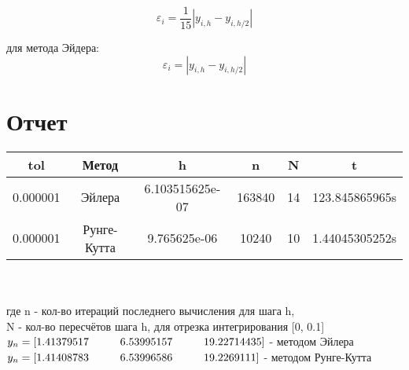 \documentclass[oneside, final, 11pt]{article}
\newcommand\tab[1][1cm]{\hspace*{#1}}
\begin{document}
\begin{equation}
\varepsilon_i = \frac{1}{15} |y_{i,h}-y_{i,h/2}|
\end{equation}

для метода Эйдера:
\begin{equation}
\varepsilon_i = |y_{i,h}-y_{i,h/2}|
\end{equation}

\section{Отчет}
\begin{tabular}{|c|c|c|c|c|c|}
\hline
tol         &   Метод       &   h   &   n   &   N   &   t   \\\hline 
0.000001    &   Эйлера      &   6.103515625e-07   &   163840   &   14   &   123.845865965s   \\\hline
0.000001    &   Рунге-Кутта &   9.765625e-06   &   10240   &   10   &   1.44045305252s   \\\hline
\end{tabular} \\ \\
где n - кол-во итераций последнего вычисления для шага h, \\
N - кол-во пересчётов шага h, для отрезка интегрирования [0, 0.1] \\
$y_n = [1.41379517\tab6.53995157\tab19.22714435]$ - методом Эйлера \\
$y_n = [1.41408783\tab6.53996586\tab19.2269111]$ - методом Рунге-Кутта \\
\end{document}
